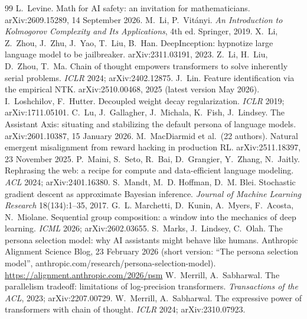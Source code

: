 \begin{thebibliography}{99}
 L.~Levine. Math for AI safety: an invitation for mathematicians. arXiv:2609.15289, 14 September 2026.
 M.~Li, P.~Vit\'anyi. \emph{An Introduction to Kolmogorov Complexity and Its Applications}, 4th ed. Springer, 2019.
 X.~Li, Z.~Zhou, J.~Zhu, J.~Yao, T.~Liu, B.~Han. DeepInception: hypnotize large language model to be jailbreaker. arXiv:2311.03191, 2023.
 Z.~Li, H.~Liu, D.~Zhou, T.~Ma. Chain of thought empowers transformers to solve inherently serial problems. \emph{ICLR} 2024; arXiv:2402.12875.
 J.~Lin. Feature identification via the empirical NTK. arXiv:2510.00468, 2025 (latest version May 2026).
 I.~Loshchilov, F.~Hutter. Decoupled weight decay regularization. \emph{ICLR} 2019; arXiv:1711.05101.
 C.~Lu, J.~Gallagher, J.~Michala, K.~Fish, J.~Lindsey. The Assistant Axis: situating and stabilizing the default persona of language models. arXiv:2601.10387, 15 January 2026.
 M.~MacDiarmid et al.\ (22 authors). Natural emergent misalignment from reward hacking in production RL. arXiv:2511.18397, 23 November 2025.
 P.~Maini, S.~Seto, R.~Bai, D.~Grangier, Y.~Zhang, N.~Jaitly. Rephrasing the web: a recipe for compute and data-efficient language modeling. \emph{ACL} 2024; arXiv:2401.16380.
 S.~Mandt, M.~D. Hoffman, D.~M. Blei. Stochastic gradient descent as approximate Bayesian inference. \emph{Journal of Machine Learning Research} 18(134):1--35, 2017.
 G.~L. Marchetti, D.~Kunin, A.~Myers, F.~Acosta, N.~Miolane. Sequential group composition: a window into the mechanics of deep learning. \emph{ICML} 2026; arXiv:2602.03655.
 S.~Marks, J.~Lindsey, C.~Olah. The persona selection model: why AI assistants might behave like humans. Anthropic Alignment Science Blog, 23 February 2026 (short version: ``The persona selection model'', anthropic.com/research/persona-selection-model). \url{https://alignment.anthropic.com/2026/psm}
 W.~Merrill, A.~Sabharwal. The parallelism tradeoff: limitations of log-precision transformers. \emph{Transactions of the ACL}, 2023; arXiv:2207.00729.
 W.~Merrill, A.~Sabharwal. The expressive power of transformers with chain of thought. \emph{ICLR} 2024; arXiv:2310.07923.

\end{thebibliography}
